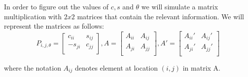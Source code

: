 \documentclass[12pt,twoside]{article}
\begin{document}
In order to figure out the values of $c,s$ and $\theta$ we will simulate a matrix multiplication with $2x2$ matrices that contain the relevant information. We will represent the matrices as follows:
\begin{equation}
P_{i,j,\theta} = 
\begin{bmatrix}
     c_{ii} & s_{ij} \\
    -s_{ji} & c_{jj} \\
\end{bmatrix}
,A = 
\begin{bmatrix}
     A_{ii} & A_{ij} \\
    A_{ji} & A_{jj} \\
\end{bmatrix}
,A' = 
\begin{bmatrix}
     A_{ii}' & A_{ij}' \\
    A_{ji}' & A_{jj}' \\
\end{bmatrix}
\end{equation}

where the notation $A_{ij}$ denotes element at location $(i,j)$ in matrix A.\\
\end{document}
